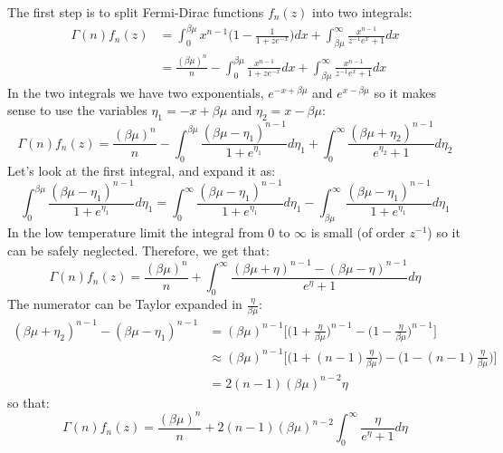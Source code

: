\documentclass[a4paper,11pt,oneside]{book}
\begin{document}
The first step is to split Fermi-Dirac functions $f_n(z)$ into two integrals:
\begin{align}
    \Gamma(n) f_n(z) &= \int_0^{\beta \mu} x^{n-1}\bigg(1-\frac{1}{1+ze^{-x}}\bigg)dx + \int_{\beta \mu}^\infty \frac{x^{n-1}}{z^{-1}e^x+1}dx \\
    &= \frac{(\beta \mu)^n}{n}-\int_0^{\beta \mu} \frac{x^{n-1}}{1+ze^{-x}}dx + \int_{\beta \mu}^\infty \frac{x^{n-1}}{z^{-1}e^x+1}dx
\end{align}
In the two integrals we have two exponentials, $e^{-x+\beta \mu}$ and $e^{x-\beta \mu}$ so it makes sense to use the variables $\eta_1 = -x+\beta\mu$ and $\eta_2 = x-\beta \mu$:
\begin{equation}
    \Gamma(n) f_n(z)=\frac{(\beta \mu)^n}{n}-\int_0^{\beta \mu} \frac{(\beta \mu -\eta_1)^{n-1}}{1+e^{\eta_1}}d\eta_1 + \int_{0}^\infty \frac{(\beta \mu +\eta_2)^{n-1}}{e^{\eta_2}+1}d\eta_2
\end{equation}
Let's look at the first integral, and expand it as:
\begin{equation}
   \int_0^{\beta \mu} \frac{(\beta \mu -\eta_1)^{n-1}}{1+e^{\eta_1}}d\eta_1 = \int_0^{\infty} \frac{(\beta \mu -\eta_1)^{n-1}}{1+e^{\eta_1}}d\eta_1 - \int_{\beta \mu}^\infty \frac{(\beta \mu -\eta_1)^{n-1}}{1+e^{\eta_1}}d\eta_1
\end{equation}
In the low temperature limit the integral from $0$ to $\infty$ is small (of order $z^{-1}$) so it can be safely neglected. Therefore, we get that:
\begin{equation}
     \Gamma(n) f_n(z) = \frac{(\beta \mu)^n}{n}+ \int_{0}^\infty \frac{(\beta \mu +\eta)^{n-1}-(\beta \mu - \eta)^{n-1}}{e^{\eta}+1}d\eta
\end{equation}
The numerator can be Taylor expanded in $\frac{\eta}{\beta \mu}$:
\begin{align}
    (\beta \mu +\eta_2)^{n-1}-(\beta \mu - \eta_1)^{n-1} &= (\beta \mu)^{n-1}\bigg[\bigg(1+\frac{\eta}{\beta \mu}\bigg)^{n-1} - \bigg(1-\frac{\eta}{\beta \mu}\bigg)^{n-1}\bigg]\\
    &\approx (\beta \mu)^{n-1}\bigg[\bigg(1+(n-1)\frac{\eta}{\beta \mu}\bigg) - \bigg(1-(n-1)\frac{\eta}{\beta \mu}\bigg)\bigg]\\
    &= 2(n-1)(\beta \mu)^{n-2} \eta 
\end{align}
so that:
\begin{equation}
     \Gamma(n) f_n(z) = \frac{(\beta \mu)^n}{n}+ 2(n-1)(\beta \mu)^{n-2}\int_{0}^\infty \frac{\eta}{e^{\eta}+1}d\eta
\end{equation}
\end{document}
